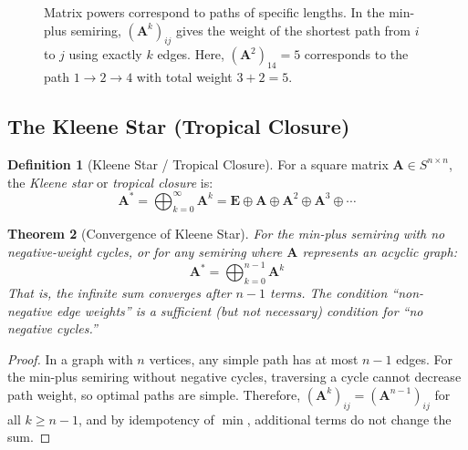 \documentclass[11pt,a4paper]{article}
\theoremstyle{plain}
\newtheorem{theorem}{Theorem}[section]
\theoremstyle{definition}
\newtheorem{definition}[theorem]{Definition}
\newcommand{\mat}[1]{\mathbf{#1}}
\begin{document}
\begin{figure}[htbp]
\caption{Matrix powers correspond to paths of specific lengths. In the min-plus semiring, $(\mat{A}^k)_{ij}$ gives the weight of the shortest path from $i$ to $j$ using exactly $k$ edges. Here, $(\mat{A}^2)_{14} = 5$ corresponds to the path $1 \to 2 \to 4$ with total weight $3+2=5$.}
\label{fig:powers-paths}
\end{figure}

\subsection{The Kleene Star (Tropical Closure)}
\label{subsec:kleene-star}

\begin{definition}[Kleene Star / Tropical Closure]
\label{def:kleene-star}
For a square matrix $\mat{A} \in S^{n \times n}$, the \emph{Kleene star} or \emph{tropical closure} is:
\begin{equation}
    \mat{A}^* = \bigoplus_{k=0}^{\infty} \mat{A}^k = \mat{E} \oplus \mat{A} \oplus \mat{A}^2 \oplus \mat{A}^3 \oplus \cdots
\end{equation}
\end{definition}

\begin{theorem}[Convergence of Kleene Star]
\label{thm:kleene-convergence}
For the min-plus semiring with \emph{no negative-weight cycles}, or for any semiring where $\mat{A}$ represents an acyclic graph:
\begin{equation}
    \mat{A}^* = \bigoplus_{k=0}^{n-1} \mat{A}^k
\end{equation}
That is, the infinite sum converges after $n-1$ terms. The condition ``non-negative edge weights'' is a sufficient (but not necessary) condition for ``no negative cycles.''
\end{theorem}

\begin{proof}
In a graph with $n$ vertices, any simple path has at most $n-1$ edges. For the min-plus semiring without negative cycles, traversing a cycle cannot decrease path weight, so optimal paths are simple. Therefore, $(\mat{A}^k)_{ij} = (\mat{A}^{n-1})_{ij}$ for all $k \geq n-1$, and by idempotency of $\min$, additional terms do not change the sum.
\end{proof}
\end{document}
